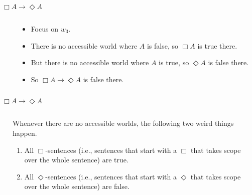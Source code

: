 \documentclass[
  14pt,
  letterpaper,
  ignorenonframetext,
  aspectratio=169,
  handout]{beamer}
\begin{document}
\begin{frame}{\(\Box A \rightarrow \Diamond A\)}
\protect\hypertarget{box-a-rightarrow-diamond-a}{}
\begin{columns}
    \begin{column}{0.45\textwidth}
    \end{column}
    \begin{column}{0.5\textwidth}
    \begin{itemize}
    \item Focus on $w_3$.
    \item There is no accessible world where $A$ is false, so $\Box A$ is true there.
    \item But there is no accessible world where $A$ is true, so $\Diamond A$ is false there.
    \item So $\Box A \rightarrow \Diamond A$ is false there.
    \end{itemize}
\end{column}
\end{columns}
\end{frame}

\begin{frame}{\(\Box A \rightarrow \Diamond A\)}
\protect\hypertarget{box-a-rightarrow-diamond-a-1}{}
\begin{columns}
    \begin{column}{0.45\textwidth}
    \end{column}
    \begin{column}{0.5\textwidth}
    Whenever there are no accessible worlds, the following two weird things happen.
    \begin{enumerate}
    \item All $\Box$-sentences (i.e., sentences that start with a $\Box$ that takes scope over the whole sentence) are true.
    \item All $\Diamond$-sentences (i.e., sentences that start with a $\Diamond$ that takes scope over the whole sentence) are false.
    \end{enumerate}
   \end{column}
\end{columns}
\end{frame}
\end{document}

